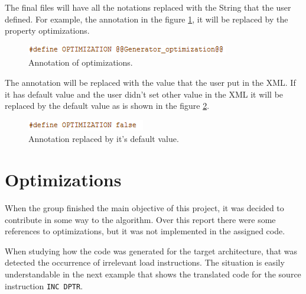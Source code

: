 \documentclass[11pt]{report}
\begin{document}
	The final files will have all the notations replaced with the String that the user defined. For example, the annotation in the figure \ref{fig:annotation}, it will be replaced by the property optimizations. 
	
	\begin{figure} [H]
		\centering
		\includegraphics[width=0.5\linewidth]{Images/anotation.PNG}
		\caption{Annotation of optimizations.}
		\label{fig:annotation}
	\end{figure}
	
	The annotation will be replaced with the value that the user put in the XML. If it has default value and the user didn't set other value in the XML it will be replaced by the default value as is shown in the figure \ref{fig:annotationReplaced}.
	
	\begin{figure} [H]
		\centering
		\includegraphics[width=0.3\linewidth]{Images/anotationReplaced.PNG}
		\caption{Annotation replaced by it's default value.}
		\label{fig:annotationReplaced}
	\end{figure}
	
	\section{Optimizations}
	
	\par When the group finished the main objective of this project, it was decided to contribute in some way to the algorithm. Over this report there were some references to optimizations, but it was not implemented in the assigned code. 
	\par When studying how the code was generated for the target architecture, that was detected the occurrence of irrelevant load instructions. The situation is easily understandable in the next example that shows the translated code for the source instruction \texttt{INC DPTR}.
	
\end{document}
